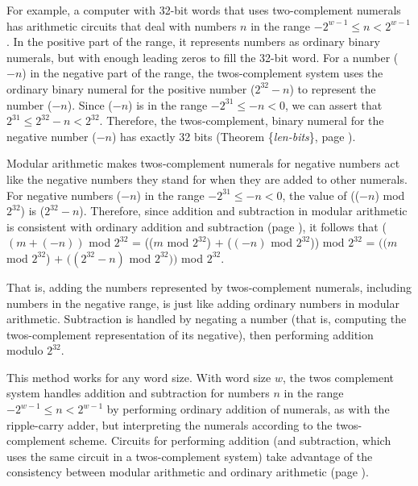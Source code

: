 For example, a computer with
32-bit words that uses
two-complement numerals has arithmetic circuits that
deal with numbers $n$ in the range $-2^{w-1} \leq n < 2^{w-1}$.
In the positive part of the range, it represents numbers as
ordinary binary numerals, but with enough leading zeros
to fill the 32-bit word.
For a number ($-n$) in the negative part of the range,
the twos-complement system uses the ordinary binary numeral
for the positive number ($2^{32}-n$) to represent the number ($-n$).
Since ($-n$) is in the range
$-2^{31} \leq -n < 0$, we can assert that
$2^{31} \leq 2^{32}-n < 2^{32}$.
Therefore, the twos-complement, binary numeral
for the negative number ($-n$)
has exactly 32 bits (Theorem \{\emph{len-bits}\}, page \pageref{len-bits}).

Modular arithmetic makes twos-complement numerals
for negative numbers act like the negative numbers they stand for
when they are added to other numerals.
For negative numbers ($-n$) in the range $-2^{31} \leq -n < 0$,
the value of (($-n$) mod $2^{32}$) is ($2^{32}-n$).
Therefore, since addition and subtraction
in modular arithmetic is consistent with ordinary addition and subtraction
(page \pageref{modular-arithmetic}), it follows that
  ($(m+(-n))$ mod $2^{32}$
= (($m$ mod $2^{32}$) $+$ ($(-n)$ mod $2^{32}$)) mod $2^{32}$
= $((m$ mod $2^{32}$) $+$ $((2^{32} - n)$ mod $2^{32}))$ mod $2^{32}$.

That is, adding the numbers represented by twos-complement
numerals, including numbers in the negative range,
is just like adding ordinary numbers in modular arithmetic.
Subtraction is handled by negating a number
(that is, computing the twos-complement representation
of its negative), then performing addition modulo $2^{32}$.

This method works for any word size.
With word size $w$, the twos complement system
handles addition and subtraction for numbers $n$
in the range $-2^{w-1} \leq n < 2^{w-1}$
by performing ordinary addition of numerals,
as with the ripple-carry adder, but interpreting
the numerals according to the twos-complement scheme.
Circuits for performing addition (and subtraction, which
uses the same circuit in a twos-complement system)
take advantage of the consistency between modular arithmetic
and ordinary arithmetic (page \pageref{modular-arithmetic}).

